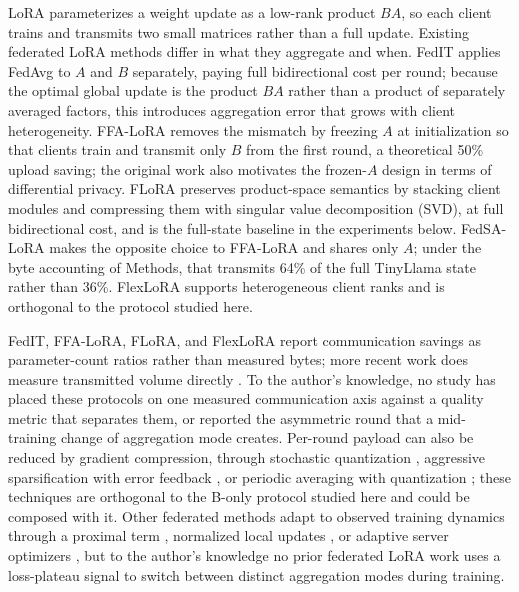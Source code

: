 \documentclass[pdflatex,sn-nature,lineno]{sn-jnl}
\begin{document}
LoRA \cite{hu2022lora} parameterizes a weight update as a low-rank product $BA$, so each client trains and transmits two small matrices rather than a full update. Existing federated LoRA methods differ in what they aggregate and when. FedIT \cite{zhang2024federatedgpt} applies FedAvg \cite{mcmahan2017communication} to $A$ and $B$ separately, paying full bidirectional cost per round; because the optimal global update is the product $BA$ rather than a product of separately averaged factors, this introduces aggregation error that grows with client heterogeneity. FFA-LoRA \cite{sun2024ffalora} removes the mismatch by freezing $A$ at initialization so that clients train and transmit only $B$ from the first round, a theoretical 50\% upload saving; the original work also motivates the frozen-$A$ design in terms of differential privacy. FLoRA \cite{wang2024flora} preserves product-space semantics by stacking client modules and compressing them with singular value decomposition (SVD), at full bidirectional cost, and is the full-state baseline in the experiments below. FedSA-LoRA \cite{guo2025fedsalora} makes the opposite choice to FFA-LoRA and shares only $A$; under the byte accounting of Methods, that transmits 64\% of the full TinyLlama state rather than 36\%. FlexLoRA \cite{bai2024flexlora} supports heterogeneous client ranks and is orthogonal to the protocol studied here.

FedIT, FFA-LoRA, FLoRA, and FlexLoRA report communication savings as parameter-count ratios rather than measured bytes; more recent work does measure transmitted volume directly \cite{yan2026fedsrd,ramesh2026florist}. To the author's knowledge, no study has placed these protocols on one measured communication axis against a quality metric that separates them, or reported the asymmetric round that a mid-training change of aggregation mode creates. Per-round payload can also be reduced by gradient compression, through stochastic quantization \cite{alistarh2017qsgd}, aggressive sparsification with error feedback \cite{lin2017deep}, or periodic averaging with quantization \cite{reisizadeh2020fedpaq}; these techniques are orthogonal to the B-only protocol studied here and could be composed with it. Other federated methods adapt to observed training dynamics through a proximal term \cite{li2020fedprox}, normalized local updates \cite{wang2020fednova}, or adaptive server optimizers \cite{reddi2020adaptive}, but to the author's knowledge no prior federated LoRA work uses a loss-plateau signal to switch between distinct aggregation modes during training.
\end{document}
